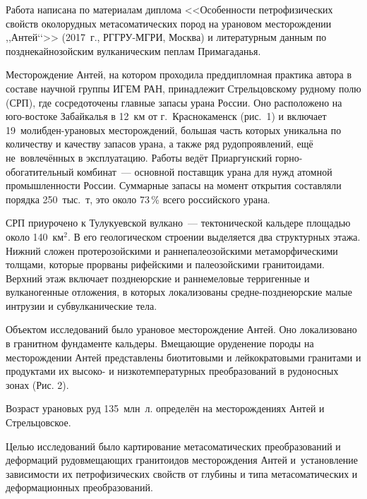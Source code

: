  

\makeProcTitle
{}

Работа написана по материалам диплома <<Особенности петрофизических свойств околорудных метасоматических пород на урановом месторождении ,,Антей‘‘>> (2017~г., РГГРУ-МГРИ, Москва) и литературным данным по позднекайнозойским вулканическим пеплам Примагаданья.



Месторождение Антей, на котором проходила преддипломная практика автора в составе научной группы ИГЕМ РАН, принадлежит Стрельцовскому рудному полю (СРП), где сосредоточены главные запасы урана России. Оно расположено на юго-востоке Забайкалья в 12~км от г.~Краснокаменск (рис.~1) и включает 19~молибден-урановых месторождений, большая часть которых уникальна по количеству и качеству запасов урана, а также ряд рудопроявлений, ещё не~вовлечённых в эксплуатацию. Работы ведёт Приаргунский горно-обогатительный комбинат~--- основной поставщик урана для нужд атомной промышленности России. Суммарные запасы на момент открытия составляли порядка 250~тыс.~т, это около 73\,\% всего российского урана.

СРП приурочено к Тулукуевской вулкано~--- тектонической кальдере площадью около 140~км$^2$. В его геологическом строении выделяется два структурных этажа. Нижний сложен протерозойскими и раннепалеозойскими метаморфическими толщами, которые прорваны рифейскими и палеозойскими гранитоидами. Верхний этаж включает позднеюрские и раннемеловые терригенные и вулканогенные отложения, в которых локализованы средне-позднеюрские малые интрузии и субвулканические тела.

Объектом исследований было урановое месторождение Антей. Оно локализовано в гранитном фундаменте кальдеры. Вмещающие оруденение породы на месторождении Антей представлены биотитовыми и лейкократовыми гранитами и продуктами их высоко- и низкотемпературных преобразований в рудоносных зонах (Рис. 2).

Возраст урановых руд 135~млн~л. определён на месторождениях Антей и Стрельцовское.



Целью исследований было картирование метасоматических преобразований и деформаций рудовмещающих гранитоидов месторождения Антей и~установление зависимости их петрофизических свойств от глубины и типа метасоматических и деформационных преобразований.

